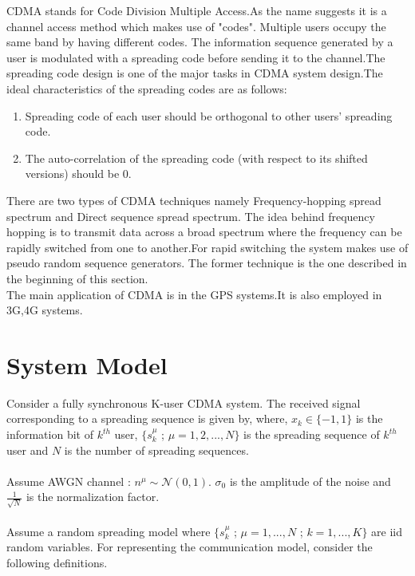 \documentclass[letterpaper,english,10pt]{article}
\begin{document}
CDMA stands for Code Division Multiple Access.As the name suggests it is a channel access method which makes use of "codes". Multiple users occupy the same band by having different codes. The information sequence generated by a user is modulated with a spreading code before sending it to the channel.The spreading code design is one of the major tasks in CDMA system design.The ideal characteristics of the spreading codes are as follows:
\begin{enumerate}
    \item Spreading code of each user should be orthogonal to other users' spreading code.
    \item The auto-correlation of the spreading code (with respect to its shifted versions) should be 0.
\end{enumerate}
There are two types of CDMA techniques namely Frequency-hopping spread spectrum and Direct sequence spread spectrum. The idea behind frequency hopping is to transmit data across a broad spectrum where the frequency can be rapidly switched from one to another.For rapid switching the system makes use of pseudo random sequence generators. The former technique is the one described in the beginning of this section.\\
The main application of CDMA is in the GPS systems.It is also employed in 3G,4G systems.

\section{System Model}
Consider a fully synchronous K-user CDMA system. The received signal corresponding to a spreading sequence is given by,
where, $x_k \in \{-1,1\}$ is the information bit of $k^{th}$ user, $\{s_k^\mu$ ; $\mu = 1,2,...,N\}$ is the spreading sequence of $k^{th}$ user and $N$ is the number of spreading sequences.\\\\
Assume AWGN channel : $n^\mu \sim \mathcal{N}(0,1)$. $\sigma_0$ is the amplitude of the noise and $\frac{1}{\sqrt{N}}$ is the normalization factor.\\\\
Assume a random spreading model where $\{s_k^\mu$ ; $\mu = 1,...,N$ ; $k=1,...,K\}$ are iid random variables. For representing the communication model, consider the following definitions.
\end{document}
